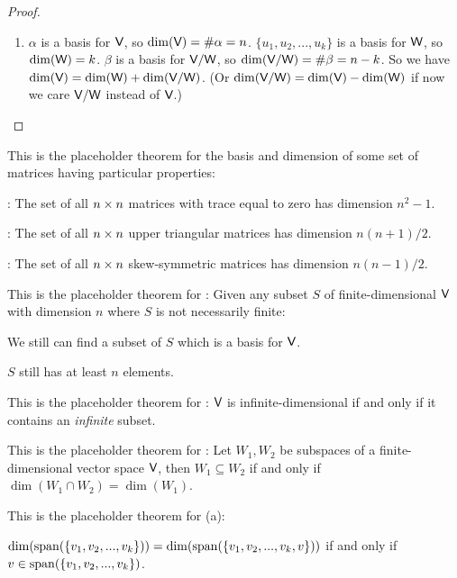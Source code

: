\begin{proof}
\begin{enumerate}
\item
\(\alpha\) is a basis for \(\textsf{V}\), so \(\dim(\textsf{V}) = \#\alpha = n\).
\(\{ u_1, u_2, ..., u_k \}\) is a basis for \(\textsf{W}\), so \(\dim(\textsf{W}) = k\).
\(\beta\) is a basis for \(\textsf{V}/\textsf{W}\), so \(\dim(\textsf{V}/\textsf{W}) = \#\beta = n - k\).
So we have \(\dim(\textsf{V}) = \dim(\textsf{W}) + \dim(\textsf{V}/\textsf{W})\).
(Or \(\dim(\textsf{V}/\textsf{W}) = \dim(\textsf{V}) - \dim(\textsf{W})\) if now we care \(\textsf{V}/\textsf{W}\) instead of \(\textsf{V}\).)
\end{enumerate}
\end{proof}

\begin{additional theorem} \label{athm 1.19}
This is the placeholder theorem for the basis and dimension of some set of matrices having particular properties:

 : The set of all \(n \times n\) matrices with trace equal to zero has dimension \(n^2 - 1\).

 : The set of all \(n \times n\) upper triangular matrices has dimension \(n(n + 1)/2\).

 : The set of all \(n \times n\) skew-symmetric matrices has dimension \(n(n - 1)/2\).
\end{additional theorem}

\begin{additional theorem} \label{athm 1.20}
This is the placeholder theorem for : Given any subset \(S\) of finite-dimensional \(\textsf{V}\) with dimension \(n\) where \(S\) is not necessarily finite:

 We still can find a subset of \(S\) which is a basis for \(\textsf{V}\).

 \(S\) still has at least \(n\) elements.
\end{additional theorem}

\begin{additional theorem} \label{athm 1.21}
This is the placeholder theorem for : \(\textsf{V}\) is infinite-dimensional if and only if it contains an \emph{infinite} \LID{} subset.
\end{additional theorem}

\begin{additional theorem} \label{athm 1.22}
This is the placeholder theorem for : Let \(W_1, W_2\) be subspaces of a finite-dimensional vector space \(\textsf{V}\), then \(W_1 \subseteq W_2\) if and only if \(\dim(W_1 \cap W_2) = \dim(W_1)\).
\end{additional theorem}

\begin{additional theorem} \label{athm 1.23}
This is the placeholder theorem for (a):

\(\dim(\operatorname{span}(\{ v_1, v_2, ..., v_k \})) = \dim(\operatorname{span}(\{ v_1, v_2, ..., v_k, v \}))\) if and only if \(v \in \operatorname{span}(\{ v_1, v_2, ..., v_k \})\).
\end{additional theorem}

